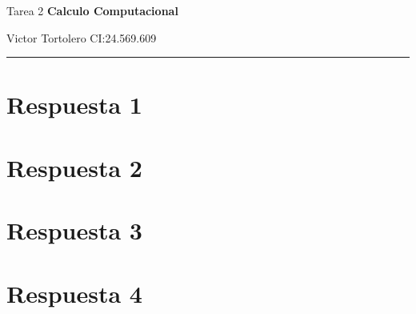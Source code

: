 \documentclass{article}
\begin{document}
\flushleft
\setlength{\parindent}{20pt}

\justify
\centerline{\huge Tarea 2 \textbf{Calculo Computacional}}
\centerline{Victor Tortolero CI:24.569.609}  %
\vspace{0.1cm}
\hrule

\section*{Respuesta 1}

\newpage

\section*{Respuesta 2}

\newpage

\section*{Respuesta 3}

\newpage

\section*{Respuesta 4}

\newpage
\end{document}
